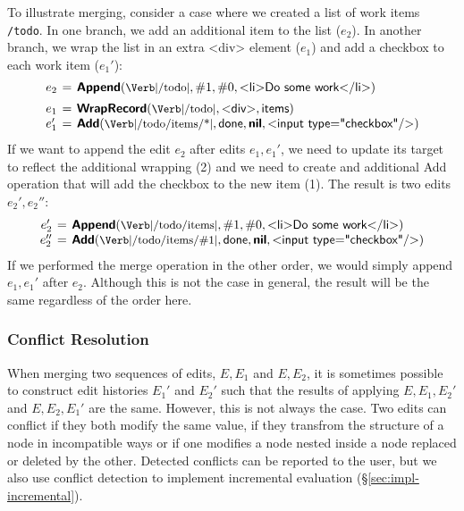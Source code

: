 \documentclass[sigconf,anonymous,screen]{acmart}
\newcommand{\ident}[1]{{\sffamily #1}}
\newcommand{\srcid}[1]{\textnormal{\sffamily #1}}
\newcommand{\srckvd}[1]{\textnormal{\sffamily\bfseries #1}}
\begin{document}
To illustrate merging, consider a case where we created a list of work items {\small\Verb|/todo|}.
In one branch, we add an additional item to the list ($e_2$). In another branch, we wrap the
list in an extra \ident{<div>} element ($e_1$) and add a checkbox to each work item ($e_1'$):
%
\begin{equation*}
\arraycolsep=2pt
\begin{array}{rcl}
e_2 &=& \srckvd{Append}(\textnormal{\small\Verb|/todo|}, \#1, \#0, \srcid{<li>Do some work</li>})\\[0.5em]
e_1 &=& \srckvd{WrapRecord}(\textnormal{\small\Verb|/todo|}, \srcid{<div>}, \srcid{items})\\
e_1' &=& \srckvd{Add}(\textnormal{\small\Verb|/todo/items/*|}, \srcid{done}, \srckvd{nil}, \srcid{<input type="checkbox"/>})\\
\end{array}
\end{equation*}
%
If we want to append the edit $e_2$ after edits $e_1, e_1'$, we need to update its target to
reflect the additional wrapping (2) and we need to create and additional \ident{Add} operation
that will add the checkbox to the new item (1). The result is two edits $e_2', e_2''$:
%
\begin{equation*}
\arraycolsep=2pt
\begin{array}{rcl}
e_2'  &=& \srckvd{Append}(\textnormal{\small\Verb|/todo/items|}, \#1, \#0, \srcid{<li>Do some work</li>})\\
e_2'' &=& \srckvd{Add}(\textnormal{\small\Verb|/todo/items/\#1|}, \srcid{done}, \srckvd{nil}, \srcid{<input type="checkbox"/>})\\
\end{array}
\end{equation*}
%
If we performed the merge operation in the other order, we would simply append $e_1, e_1'$ after
$e_2$. Although this is not the case in general, the result will be the same regardless of the order here.

\subsubsection*{Conflict Resolution}
When merging two sequences of edits, $E, E_1$ and $E, E_2$, it is sometimes possible to construct
edit histories $E_1'$ and $E_2'$ such that the results of applying $E, E_1, E_2'$ and
$E, E_2, E_1'$ are the same. However, this is not always the case. Two edits can conflict if
they both modify the same value, if they transfrom the structure of a node in incompatible ways
or if one modifies a node nested inside a node replaced or deleted by the other.
Detected conflicts can be reported to the user, but we also use conflict detection to
implement incremental evaluation (\S\ref{sec:impl-incremental}).
\end{document}
